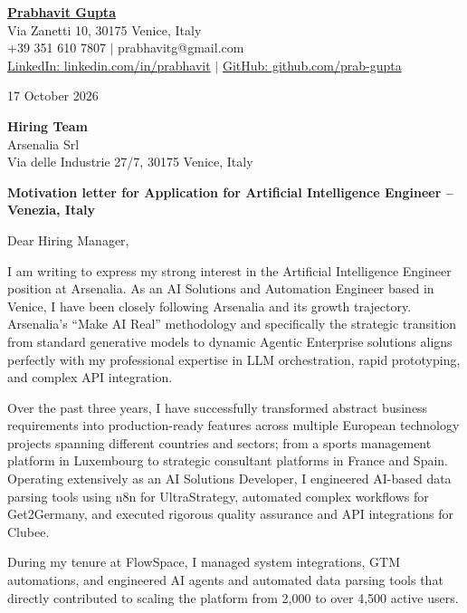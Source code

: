 \documentclass[10pt,a4paper]{article}
\begin{document}
\begin{flushleft}
\textbf{\underline{Prabhavit Gupta}}\\
Via Zanetti 10, 30175 Venice, Italy\\
+39 351 610 7807 $|$ prabhavitg@gmail.com\\
\href{https://www.linkedin.com/in/prabhavit/}{LinkedIn: linkedin.com/in/prabhavit} $|$ \href{https://github.com/prab-gupta}{GitHub: github.com/prab-gupta}
\end{flushleft}

\vspace{0.5em}
17 October 2026

\vspace{0.5em}
\textbf{Hiring Team}\\
Arsenalia Srl\\
Via delle Industrie 27/7, 30175 Venice, Italy

\vspace{0.5em}
\textbf{Motivation letter for Application for Artificial Intelligence Engineer -- Venezia, Italy}

\vspace{0.5em}
Dear Hiring Manager,

I am writing to express my strong interest in the Artificial Intelligence Engineer position at Arsenalia. As an AI Solutions and Automation Engineer based in Venice, I have been closely following Arsenalia and its growth trajectory. Arsenalia's ``Make AI Real'' methodology and specifically the strategic transition from standard generative models to dynamic Agentic Enterprise solutions aligns perfectly with my professional expertise in LLM orchestration, rapid prototyping, and complex API integration.

Over the past three years, I have successfully transformed abstract business requirements into production-ready features across multiple European technology projects spanning different countries and sectors; from a sports management platform in Luxembourg to strategic consultant platforms in France and Spain. Operating extensively as an AI Solutions Developer, I engineered AI-based data parsing tools using n8n for UltraStrategy, automated complex workflows for Get2Germany, and executed rigorous quality assurance and API integrations for Clubee.

During my tenure at FlowSpace, I managed system integrations, GTM automations, and engineered AI agents and automated data parsing tools that directly contributed to scaling the platform from 2,000 to over 4,500 active users.
\end{document}
